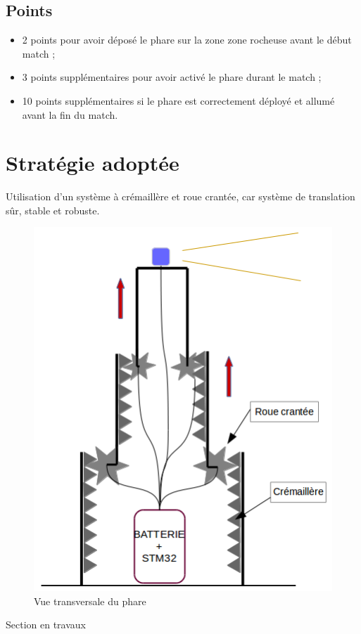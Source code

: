 \documentclass{article}
\begin{document}
\pagebreak

\subsection{Points}
\begin{itemize}
\item 2 points pour avoir déposé le phare sur la zone zone rocheuse avant le début match ;
\item 3 points supplémentaires pour avoir activé le phare durant le match ;
\item 10 points supplémentaires si le phare est correctement déployé et allumé avant la fin du match.
\end{itemize}


\section{Stratégie adoptée}
Utilisation d'un système à crémaillère et roue crantée, car système de translation sûr, stable et robuste.
\begin{figure}[!h]
\centering
\includegraphics[scale=0.7]{Pictures/Schema_phare.png}
\caption{Vue transversale du phare}
\end{figure}
Section en travaux
\end{document}
